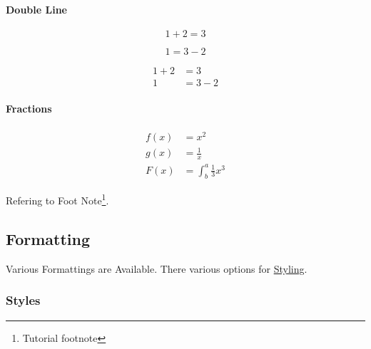 \documentclass{report}[a4paper,12pt] %
\begin{document}
\paragraph*{Double Line}

\begin{equation*}
  1 + 2 = 3 
\end{equation*}

\begin{equation*}
  1 = 3 - 2
\end{equation*}

\begin{align*}
  1 + 2 &= 3\\
  1 &= 3 - 2
\end{align*}

\paragraph{Fractions}

\begin{align*}
  f(x) &= x^2\\
  g(x) &= \frac{1}{x}\\
  F(x) &= \int^a_b \frac{1}{3}x^3
\end{align*}

Refering to Foot Note\footnote{\label{myfootnote}Tutorial footnote}.

\subsection{Formatting}
Various \hypertarget{sen:formatopts}{Formattings} are Available. There various options for \href{https://www.overleaf.com/learn/latex/Font_sizes%2C_families%2C_and_styles}{Styling}.

\subsubsection{Styles}
\end{document}
